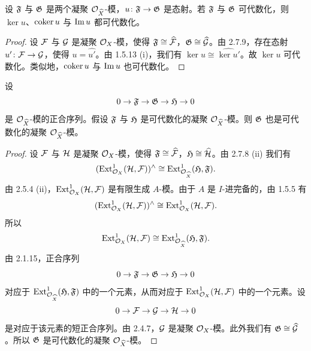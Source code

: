 \begin{lemma}\label{it:2.7.12}
设 $\fF$ 与 $\fG$ 是两个凝聚 $\cO_{\widehat{X}}$-模，$u\colon\fF\to\fG$ 是态射。若 $\fF$ 与 $\fG$ 可代数化，则 $\ker u$、$\coker u$ 与 $\Image u$ 都可代数化。
\end{lemma}

\begin{proof}
设 $\cF$ 与 $\cG$ 是凝聚 $\cO_X$-模，使得 $\fF\cong\widehat{\cF}$，$\fG\cong\widehat{\cG}$。由 2.7.9，存在态射 $u'\colon\cF\to\cG$，使得 $u=\widehat{u'}$。由 1.5.13 (i)，我们有 $\ker u\cong\widehat{\ker u'}$。故 $\ker u$ 可代数化。类似地，$\coker u$ 与 $\Image u$ 也可代数化。
\end{proof}

\begin{lemma}\label{it:2.7.13}
设
\begin{equation*}
0\to\fF\to\fG\to\fH\to 0
\end{equation*}
是 $\cO_{\widehat{X}}$-模的正合序列。假设 $\fF$ 与 $\fH$ 是可代数化的凝聚 $\cO_{\widehat{X}}$-模。则 $\fG$ 也是可代数化的凝聚 $\cO_{\widehat{X}}$-模。
\end{lemma}

\begin{proof}
设 $\cF$ 与 $\cH$ 是凝聚 $\cO_X$-模，使得 $\fF\cong\widehat{\cF}$，$\fH\cong\widehat{\cH}$。由 2.7.8 (ii) 我们有
\begin{equation*}
(\Ext^1_{\cO_X}(\cH,\cF))^{\wedge}\cong\Ext^1_{\cO_{\widehat{X}}}(\fH,\fF).
\end{equation*}
由 2.5.4 (ii)，$\Ext^1_{\cO_X}(\cH,\cF)$ 是有限生成 $A$-模。由于 $A$ 是 $I$-进完备的，由 1.5.5 有
\begin{equation*}
(\Ext^1_{\cO_X}(\cH,\cF))^{\wedge}\cong\Ext^1_{\cO_X}(\cH,\cF).
\end{equation*}
所以
\begin{equation*}
\Ext^1_{\cO_X}(\cH,\cF)\cong\Ext^1_{\cO_{\widehat{X}}}(\fH,\fF).
\end{equation*}
由 2.1.15，正合序列
\begin{equation*}
0\to\fF\to\fG\to\fH\to 0
\end{equation*}
对应于 $\Ext^1_{\cO_{\widehat{X}}}(\fH,\fF)$ 中的一个元素，从而对应于 $\Ext^1_{\cO_X}(\cH,\cF)$ 中的一个元素。设
\begin{equation*}
0\to\cF\to\cG\to\cH\to 0
\end{equation*}
是对应于该元素的短正合序列。由 2.4.7，$\cG$ 是凝聚 $\cO_X$-模。此外我们有 $\fG\cong\widehat{\cG}$。所以 $\fG$ 是可代数化的凝聚 $\cO_{\widehat{X}}$-模。
\end{proof}
